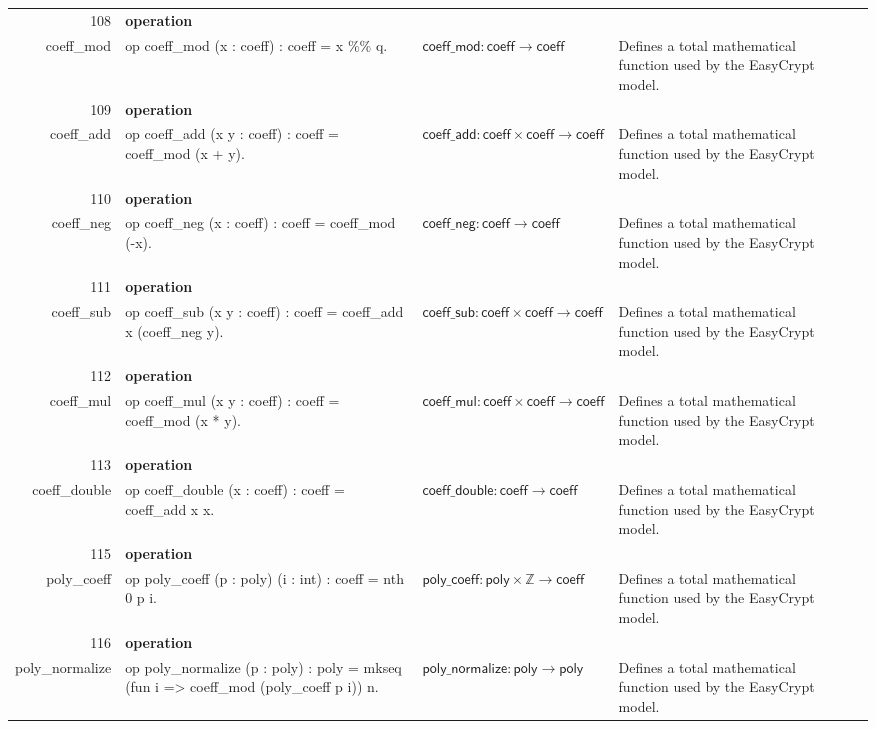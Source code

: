 \documentclass[10pt]{article}
\newcommand{\ec}[1]{\begingroup\ttfamily\scriptsize #1\endgroup}
\begin{document}
\begin{longtable}{r L{0.17\textwidth} L{0.26\textwidth} L{0.27\textwidth} L{0.20\textwidth}}
108 & \textbf{operation}\\\ec{coeff\_mod} & \ec{op coeff\_mod (x : coeff) : coeff = x \%\% q.} & \(\mathsf{coeff\_mod} : \mathsf{coeff} \to \mathsf{coeff}\) & Defines a total mathematical function used by the EasyCrypt model. \\
109 & \textbf{operation}\\\ec{coeff\_add} & \ec{op coeff\_add (x y : coeff) : coeff = coeff\_mod (x + y).} & \(\mathsf{coeff\_add} : \mathsf{coeff} \times \mathsf{coeff} \to \mathsf{coeff}\) & Defines a total mathematical function used by the EasyCrypt model. \\
110 & \textbf{operation}\\\ec{coeff\_neg} & \ec{op coeff\_neg (x : coeff) : coeff = coeff\_mod (-x).} & \(\mathsf{coeff\_neg} : \mathsf{coeff} \to \mathsf{coeff}\) & Defines a total mathematical function used by the EasyCrypt model. \\
111 & \textbf{operation}\\\ec{coeff\_sub} & \ec{op coeff\_sub (x y : coeff) : coeff = coeff\_add x (coeff\_neg y).} & \(\mathsf{coeff\_sub} : \mathsf{coeff} \times \mathsf{coeff} \to \mathsf{coeff}\) & Defines a total mathematical function used by the EasyCrypt model. \\
112 & \textbf{operation}\\\ec{coeff\_mul} & \ec{op coeff\_mul (x y : coeff) : coeff = coeff\_mod (x * y).} & \(\mathsf{coeff\_mul} : \mathsf{coeff} \times \mathsf{coeff} \to \mathsf{coeff}\) & Defines a total mathematical function used by the EasyCrypt model. \\
113 & \textbf{operation}\\\ec{coeff\_double} & \ec{op coeff\_double (x : coeff) : coeff = coeff\_add x x.} & \(\mathsf{coeff\_double} : \mathsf{coeff} \to \mathsf{coeff}\) & Defines a total mathematical function used by the EasyCrypt model. \\
115 & \textbf{operation}\\\ec{poly\_coeff} & \ec{op poly\_coeff (p : poly) (i : int) : coeff = nth 0 p i.} & \(\mathsf{poly\_coeff} : \mathsf{poly} \times \mathbb{Z} \to \mathsf{coeff}\) & Defines a total mathematical function used by the EasyCrypt model. \\
116 & \textbf{operation}\\\ec{poly\_normalize} & \ec{op poly\_normalize (p : poly) : poly = mkseq (fun i => coeff\_mod (poly\_coeff p i)) n.} & \(\mathsf{poly\_normalize} : \mathsf{poly} \to \mathsf{poly}\) & Defines a total mathematical function used by the EasyCrypt model. \\

\end{longtable}
\end{document}
